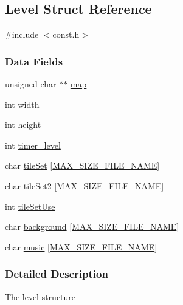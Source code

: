 \hypertarget{struct_level}{\subsection{Level Struct Reference}
\label{struct_level}
}


{\ttfamily \#include $<$const.\-h$>$}

\subsubsection*{Data Fields}
\begin{DoxyCompactItemize}
\item 
unsigned char $\ast$$\ast$ \hyperlink{struct_level_a6d985f8729c187f1c35dabba2738f0bd}{map}
\item 
int \hyperlink{struct_level_a2474a5474cbff19523a51eb1de01cda4}{width}
\item 
int \hyperlink{struct_level_ad12fc34ce789bce6c8a05d8a17138534}{height}
\item 
int \hyperlink{struct_level_a28c59da9677a9d7b98db49328a77dc3c}{timer\-\_\-level}
\item 
char \hyperlink{struct_level_a65e1491050070e8d940ac310bb3ee901}{tile\-Set} \mbox{[}\hyperlink{const_8h_a95feb1f1a8c13ebeb7da1e49b2896c24}{M\-A\-X\-\_\-\-S\-I\-Z\-E\-\_\-\-F\-I\-L\-E\-\_\-\-N\-A\-M\-E}\mbox{]}
\item 
char \hyperlink{struct_level_a31c790abec040f1888acf0e062d1c827}{tile\-Set2} \mbox{[}\hyperlink{const_8h_a95feb1f1a8c13ebeb7da1e49b2896c24}{M\-A\-X\-\_\-\-S\-I\-Z\-E\-\_\-\-F\-I\-L\-E\-\_\-\-N\-A\-M\-E}\mbox{]}
\item 
int \hyperlink{struct_level_ad086ee40635033453f3e41bc143af7b7}{tile\-Set\-Use}
\item 
char \hyperlink{struct_level_a138d74a180ed8126b24d9b9b5b135882}{background} \mbox{[}\hyperlink{const_8h_a95feb1f1a8c13ebeb7da1e49b2896c24}{M\-A\-X\-\_\-\-S\-I\-Z\-E\-\_\-\-F\-I\-L\-E\-\_\-\-N\-A\-M\-E}\mbox{]}
\item 
char \hyperlink{struct_level_a16d4a8b2aa62b5e644923bdf44da16f7}{music} \mbox{[}\hyperlink{const_8h_a95feb1f1a8c13ebeb7da1e49b2896c24}{M\-A\-X\-\_\-\-S\-I\-Z\-E\-\_\-\-F\-I\-L\-E\-\_\-\-N\-A\-M\-E}\mbox{]}
\end{DoxyCompactItemize}


\subsubsection{Detailed Description}
The level structure 

